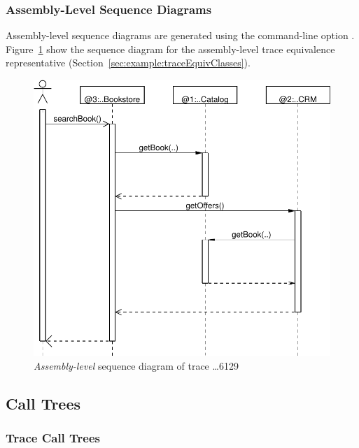 \pagebreak

\subsubsection{Assembly-Level Sequence Diagrams}\label{sec:example:assemblySeqDiagrams}%

Assembly-level sequence diagrams are generated using the command-line option \OPT{\OPTplotAssemblySequenceDiagrams}. %
Figure~\ref{fig:appendix:traceAnalysisExample:SeqDiagrDepl6129} %
show the sequence diagram for the assembly-level trace equivalence representative %
(Section~\ref{sec:example:traceEquivClasses}).

\begin{figure}[h]\centering
\includegraphics[scale=0.39]{images/example-plots/assemblySequenceDiagram-6488138950668976129-crop}
\caption{\textit{Assembly-level} sequence diagram of trace \ldots{}6129}
\label{fig:appendix:traceAnalysisExample:SeqDiagrDepl6129}
\end{figure}


\subsection{Call Trees}\label{sec:example:callTrees}%

\subsubsection{Trace Call Trees}\label{sec:example:traceCallTrees}%

